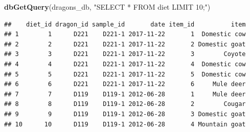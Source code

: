 \documentclass[
]{book}
\newenvironment{Shaded}{\begin{snugshade}}{\end{snugshade}}
\newcommand{\AttributeTok}[1]{\textcolor[rgb]{0.13,0.29,0.53}{#1}}
\newcommand{\ConstantTok}[1]{\textcolor[rgb]{0.56,0.35,0.01}{#1}}
\newcommand{\DecValTok}[1]{\textcolor[rgb]{0.00,0.00,0.81}{#1}}
\newcommand{\FunctionTok}[1]{\textcolor[rgb]{0.13,0.29,0.53}{\textbf{#1}}}
\newcommand{\NormalTok}[1]{#1}
\newcommand{\OtherTok}[1]{\textcolor[rgb]{0.56,0.35,0.01}{#1}}
\newcommand{\SpecialCharTok}[1]{\textcolor[rgb]{0.81,0.36,0.00}{\textbf{#1}}}
\newcommand{\StringTok}[1]{\textcolor[rgb]{0.31,0.60,0.02}{#1}}
\begin{document}
\begin{Shaded}
\end{Shaded}

\begin{Shaded}
\begin{Highlighting}[]
\FunctionTok{dbGetQuery}\NormalTok{(dragons\_db, }\StringTok{"SELECT * FROM diet LIMIT 10;"}\NormalTok{)}
\end{Highlighting}
\end{Shaded}

\begin{verbatim}
##    diet_id dragon_id sample_id       date item_id          item
## 1        1      D221    D221-1 2017-11-22       1  Domestic cow
## 2        2      D221    D221-1 2017-11-22       2 Domestic goat
## 3        3      D221    D221-1 2017-11-22       3        Coyote
## 4        4      D221    D221-1 2017-11-22       4  Domestic cow
## 5        5      D221    D221-1 2017-11-22       5  Domestic cow
## 6        6      D221    D221-1 2017-11-22       6     Mule deer
## 7        7      D119    D119-1 2012-06-28       1     Mule deer
## 8        8      D119    D119-1 2012-06-28       2        Cougar
## 9        9      D119    D119-1 2012-06-28       3 Domestic goat
## 10      10      D119    D119-1 2012-06-28       4 Mountain goat
\end{verbatim}
\end{document}
